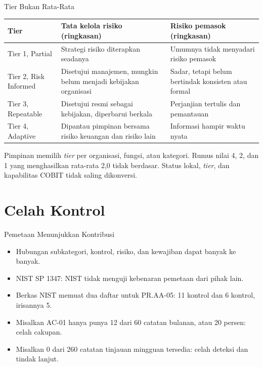 \documentclass[aspectratio=169, table, 12pt]{beamer}
\begin{document}
\begin{frame}{{\Large Tier Bukan Rata-Rata}}
  \vspace{2pt}
  \scriptsize
  \begin{tabularx}{\textwidth}{|>{\raggedright\arraybackslash}p{}|>{\raggedright\arraybackslash}X|>{\raggedright\arraybackslash}X|}
    \hline
    \textbf{Tier} & \textbf{Tata kelola risiko (ringkasan)} & \textbf{Risiko pemasok (ringkasan)} \\
    \hline
    Tier 1, Partial & Strategi risiko diterapkan seadanya & Umumnya tidak menyadari risiko pemasok \\
    \hline
    Tier 2, Risk Informed & Disetujui manajemen, mungkin belum menjadi kebijakan organisasi & Sadar,
    tetapi belum bertindak konsisten atau formal \\ \hline
    Tier 3, Repeatable & Disetujui resmi sebagai kebijakan, diperbarui berkala & Perjanjian tertulis
    dan pemantauan \\ \hline
    Tier 4, Adaptive & Dipantau pimpinan bersama risiko keuangan dan risiko lain & Informasi hampir
    waktu nyata \\ \hline
  \end{tabularx}

  \vspace{6pt}
  \small Pimpinan memilih \textit{tier} per organisasi, fungsi, atau kategori. Rumus nilai 4, 2, dan
  1 yang menghasilkan rata-rata 2,0 tidak berdasar. Status lokal, \textit{tier}, dan kapabilitas
  COBIT tidak saling dikonversi.
\end{frame}

\section{Celah Kontrol}

\begin{frame}{{\Large Pemetaan Menunjukkan Kontribusi}}
  \vspace{6pt}
  \small
  \begin{itemize}
    \item Hubungan subkategori, kontrol, risiko, dan kewajiban dapat banyak ke banyak.
    \item NIST SP 1347: NIST tidak menguji kebenaran pemetaan dari pihak lain.
    \item Berkas NIST memuat dua daftar untuk PR.AA-05: 11 kontrol dan 6 kontrol, irisannya 5.
    \item Misalkan AC-01 hanya punya 12 dari 60 catatan bulanan, atau 20 persen: celah cakupan.
    \item Misalkan 0 dari 260 catatan tinjauan mingguan tersedia: celah deteksi dan tindak lanjut.
  \end{itemize}
\end{frame}
\end{document}
